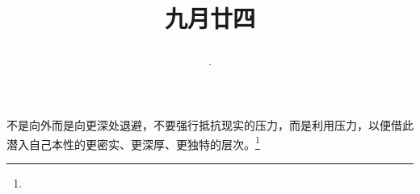 \title{\date[d=26,m=10,y=2024][year:cn-y,年,month:cn,day:cn,日,·,weekday]·九月廿四 }
不是向外而是向更深处退避，不要强行抵抗现实的压力，而是利用压力，以便借此潜入自己本性的更密实、更深厚、更独特的层次。\footnote{ }


